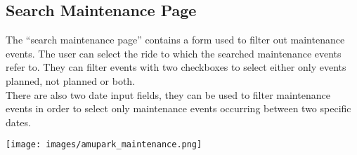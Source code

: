 \subsection{Search Maintenance Page}
The “search maintenance page” contains a form used to filter out maintenance events. The user can select the ride to which the searched maintenance events refer to. They can filter events with two checkboxes to select either only events planned, not planned or both.\\

There are also two date input fields, they can be used to filter maintenance events in order to select only maintenance events occurring between two specific dates.


\texttt{[image: images/amupark\_maintenance.png]}